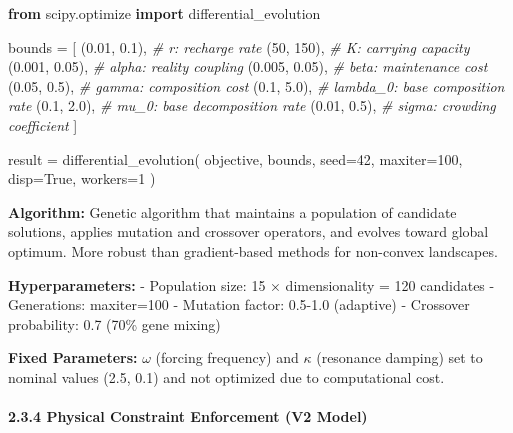 \documentclass[
]{article}
\newenvironment{Shaded}{}{}
\newcommand{\CommentTok}[1]{\textcolor[rgb]{0.38,0.63,0.69}{\textit{#1}}}
\newcommand{\DecValTok}[1]{\textcolor[rgb]{0.25,0.63,0.44}{#1}}
\newcommand{\FloatTok}[1]{\textcolor[rgb]{0.25,0.63,0.44}{#1}}
\newcommand{\ImportTok}[1]{\textcolor[rgb]{0.00,0.50,0.00}{\textbf{#1}}}
\newcommand{\NormalTok}[1]{#1}
\newcommand{\OperatorTok}[1]{\textcolor[rgb]{0.40,0.40,0.40}{#1}}
\newcommand{\VariableTok}[1]{\textcolor[rgb]{0.10,0.09,0.49}{#1}}
\begin{document}
\begin{Shaded}
\begin{Highlighting}[]
\ImportTok{from}\NormalTok{ scipy.optimize }\ImportTok{import}\NormalTok{ differential\_evolution}

\NormalTok{bounds }\OperatorTok{=}\NormalTok{ [}
\NormalTok{    (}\FloatTok{0.01}\NormalTok{, }\FloatTok{0.1}\NormalTok{),    }\CommentTok{\# r: recharge rate}
\NormalTok{    (}\DecValTok{50}\NormalTok{, }\DecValTok{150}\NormalTok{),      }\CommentTok{\# K: carrying capacity}
\NormalTok{    (}\FloatTok{0.001}\NormalTok{, }\FloatTok{0.05}\NormalTok{),  }\CommentTok{\# alpha: reality coupling}
\NormalTok{    (}\FloatTok{0.005}\NormalTok{, }\FloatTok{0.05}\NormalTok{),  }\CommentTok{\# beta: maintenance cost}
\NormalTok{    (}\FloatTok{0.05}\NormalTok{, }\FloatTok{0.5}\NormalTok{),    }\CommentTok{\# gamma: composition cost}
\NormalTok{    (}\FloatTok{0.1}\NormalTok{, }\FloatTok{5.0}\NormalTok{),     }\CommentTok{\# lambda\_0: base composition rate}
\NormalTok{    (}\FloatTok{0.1}\NormalTok{, }\FloatTok{2.0}\NormalTok{),     }\CommentTok{\# mu\_0: base decomposition rate}
\NormalTok{    (}\FloatTok{0.01}\NormalTok{, }\FloatTok{0.5}\NormalTok{),    }\CommentTok{\# sigma: crowding coefficient}
\NormalTok{]}

\NormalTok{result }\OperatorTok{=}\NormalTok{ differential\_evolution(}
\NormalTok{    objective,}
\NormalTok{    bounds,}
\NormalTok{    seed}\OperatorTok{=}\DecValTok{42}\NormalTok{,}
\NormalTok{    maxiter}\OperatorTok{=}\DecValTok{100}\NormalTok{,}
\NormalTok{    disp}\OperatorTok{=}\VariableTok{True}\NormalTok{,}
\NormalTok{    workers}\OperatorTok{=}\DecValTok{1}
\NormalTok{)}
\end{Highlighting}
\end{Shaded}

\textbf{Algorithm:} Genetic algorithm that maintains a population of
candidate solutions, applies mutation and crossover operators, and
evolves toward global optimum. More robust than gradient-based methods
for non-convex landscapes.

\textbf{Hyperparameters:} - Population size: 15 × dimensionality = 120
candidates - Generations: maxiter=100 - Mutation factor: 0.5-1.0
(adaptive) - Crossover probability: 0.7 (70\% gene mixing)

\textbf{Fixed Parameters:} $\omega$ (forcing frequency) and $\kappa$ (resonance
damping) set to nominal values (2.5, 0.1) and not optimized due to
computational cost.

\paragraph{2.3.4 Physical Constraint Enforcement (V2
Model)}\label{physical-constraint-enforcement-v2-model}
\end{document}
